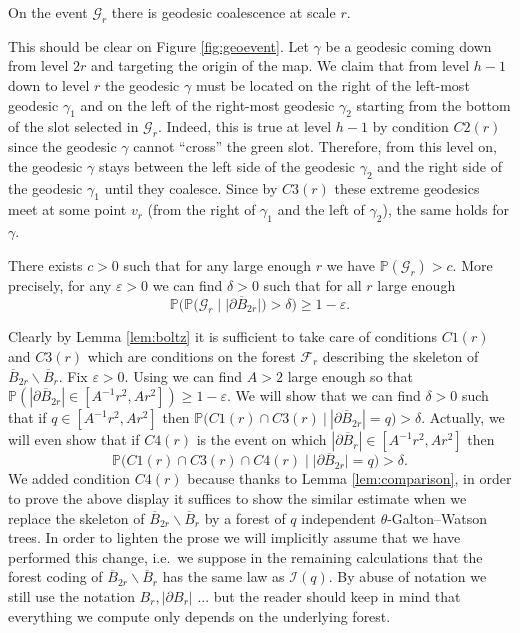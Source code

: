 \documentclass[AHL,XML,longabstracts,Unicode,NoSaveZebib]{cedram}
\begin{document}
\begin{lemma} On the event $  \mathcal{G}_{r}$ there is geodesic coalescence at scale $r$.
\end{lemma}
\proof This should be clear on Figure \ref{fig:geoevent}. Let $\gamma$ be a geodesic coming down from level $2r$ and targeting the origin of the map. We claim that from level $h-1$ down to level $r$ the geodesic $\gamma$ {must be located on the right of the left-most geodesic $\gamma_1$ and on the left of the right-most geodesic $\gamma_2$ starting from the bottom of the slot selected in $ \mathcal{G}_{r}$. Indeed, this is true at level $h-1$ by condition $C2(r)$ since the geodesic $\gamma$ cannot ``cross'' the green slot. {Therefore, from this level on, the geodesic $\gamma$ stays between the left side of the geodesic $\gamma_2$ and the right side of the geodesic $\gamma_1$ until they coalesce}. Since by $C3(r)$ these extreme geodesics meet at some point $v_{r}$ (from the right of $\gamma_{1}$ and the left of $\gamma_{2}$), the same holds for $\gamma$}. \endproof

\begin{proposition} \label{prop:positive} There exists $c>0$ such that for any large enough $r$ we have $ \mathbb{P}( \mathcal{G}_{r}) > c$. More precisely, for any $ \varepsilon>0$ we can find $ \delta >0$ such that for all $r$ large enough
$$  \mathbb{P} \bigg( \mathbb{P} \big( \mathcal{G}_{r} \mid \big| \partial \overline{B}_{2r} \big| \big) > \delta \bigg) \geq 1- \varepsilon.$$
\end{proposition}
\proof Clearly by Lemma \ref{lem:boltz} it is sufficient to take care of conditions $C1(r)$ and $C3(r)$ which are conditions on the forest $ \mathcal{F}_{r}$ describing  the skeleton of $ \overline{B}_{2r} \backslash \overline{B}_{r}$. Fix $ \varepsilon>0$. Using \cite[Remark 3]{CLGfpp} we can find $A>2$ large enough so that $ \mathbb{P}(|\partial \overline{B}_{2r}| \in [A^{-1}r^{2},Ar^{2}]) \geq 1 - \varepsilon$. We will show that we can find $\delta >0$ such that if $q \in  [A^{-1}r^{2},Ar^{2}]$ then  $\mathbb{P} \big( C1(r) \cap C3(r) ~\big | ~ | \partial \overline{B}_{2r} | = q \big) > \delta$.
Actually, we will even show that if $C4(r)$ is the event on which $| \partial \overline{B}_{r}| \in [A^{-1}r^{2}, Ar^{2}]$ then
$$\mathbb{P} \big( C1(r) \cap C3(r)  \cap C4(r) \mid | \partial \overline{B}_{2r} \big| = q \big) > \delta.$$
We added condition $C4(r)$ because thanks to  Lemma \ref{lem:comparison}, in order to prove the above display it suffices to show the similar estimate when we replace the skeleton of $ \overline{B}_{2r} \backslash \overline{B}_{r}$ by a forest of $q$ independent $\theta$-Galton--Watson trees. In order to lighten the prose we will implicitly assume that we have performed this change, i.e.~we suppose in the remaining calculations that the forest coding of $\overline{B}_{2r} \backslash \overline{B}_{r}$ has the same law as $ \mathcal{I}(q)$. By abuse of notation we still use the notation $B_r,|\partial B_r|$ ... but the reader should keep in mind that everything we compute only depends on the underlying forest.
\end{document}
